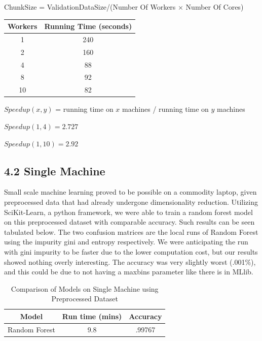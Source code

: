 \documentclass{neu_handout}
\begin{document}
\begin{center}
ChunkSize = ValidationDataSize/(Number Of Workers $\times$ Number Of Cores)
\end{center}


\begin{center}
 \begin{tabular}{||c c ||} 
 \hline
Workers & Running Time (seconds) \\ [0.5ex] 
 \hline\hline
 1 & 240  \\ 
 \hline
 2 & 160  \\ 
 \hline
 4 & 88  \\ 
 \hline
 8 & 92  \\ 
 \hline
 10 & 82  \\  [1ex] 
 \hline
\end{tabular}
\end{center}

\begin{center}
$Speed up(x,y)$ = running time on $x$ machines / running time on $y$ machines

$Speed up(1,4) = 2.727$

$Speed up(1,10) = 2.92$
\end{center}


\subsection*{4.2 Single Machine}

Small scale machine learning proved to be possible on a commodity laptop, given preprocessed data that had already undergone dimensionality reduction. Utilizing SciKit-Learn, a python framework, we were able to train a random forest model on this preprocessed dataset with comparable accuracy. Such results can be seen tabulated below. The two confusion matrices are the local runs of Random Forest using the impurity gini and entropy respectively. We were anticipating the run with gini impurity to be faster due to the lower computation cost, but our results showed nothing overly interesting. The accuracy was very slightly worst (.001\%), and this could be due to not having a maxbins parameter like there is in MLlib.\\

\begin{table}[h!]
\centering
 \begin{tabular}{||c c c||} 
 \hline
Model & Run time (mins) & Accuracy \\ [0.5ex] 
 \hline\hline
Random Forest & 9.8  & .99767   \\[1ex] 
\hline
 \end{tabular}
 \caption{Comparison of Models on Single Machine using Preprocessed Dataset}
 \label{tab:accuracy-comparison}
\end{table}
\end{document}
